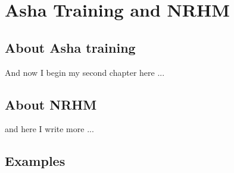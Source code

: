 \chapter{Asha Training and NRHM}
\ifpdf
    \graphicspath{{Chapter2/Chapter2Figs/PNG/}{Chapter2/Chapter2Figs/PDF/}{Chapter2/Chapter2Figs/}}
\else
    \graphicspath{{Chapter2/Chapter2Figs/EPS/}{Chapter2/Chapter2Figs/}}
\fi

\section{About Asha training}
And now I begin my second chapter here ...

\section{About NRHM}
and here I write more ...

\section{Examples}






